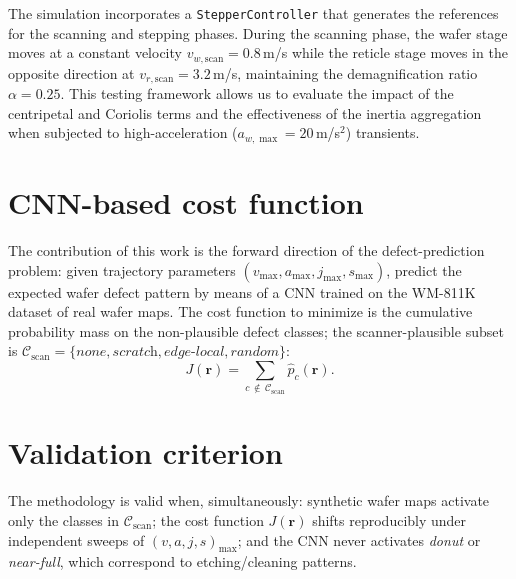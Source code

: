 \documentclass[11pt,letterpaper]{article}
\begin{document}
The simulation incorporates a \texttt{StepperController} that generates the references for the scanning and stepping phases. During the scanning phase, the wafer stage moves at a constant velocity $v_{w,\text{scan}} = 0.8$\,m/s while the reticle stage moves in the opposite direction at $v_{r,\text{scan}} = 3.2$\,m/s, maintaining the demagnification ratio $\alpha = 0.25$. This testing framework allows us to evaluate the impact of the centripetal and Coriolis terms and the effectiveness of the inertia aggregation when subjected to high-acceleration ($a_{w,\max} = 20$\,m/s$^2$) transients.

\section*{CNN-based cost function}

The contribution of this work is the forward direction of the defect-prediction problem: given trajectory parameters $(v_{\max}, a_{\max}, j_{\max}, s_{\max})$, predict the expected wafer defect pattern by means of a CNN trained on the WM-811K dataset of real wafer maps. The cost function to minimize is the cumulative probability mass on the non-plausible defect classes; the scanner-plausible subset is $\mathcal{C}_{\text{scan}} = \{\textit{none}, \textit{scratch}, \textit{edge-local}, \textit{random}\}$:
\begin{equation}
    J(\boldsymbol{r}) = \sum_{c\,\notin\,\mathcal{C}_{\text{scan}}} \hat{p}_c(\boldsymbol{r}).
\end{equation}

\section*{Validation criterion}

The methodology is valid when, simultaneously: synthetic wafer maps activate only the classes in $\mathcal{C}_{\text{scan}}$; the cost function $J(\boldsymbol{r})$ shifts reproducibly under independent sweeps of $(v, a, j, s)_{\max}$; and the CNN never activates \textit{donut} or \textit{near-full}, which correspond to etching/cleaning patterns.
\end{document}
